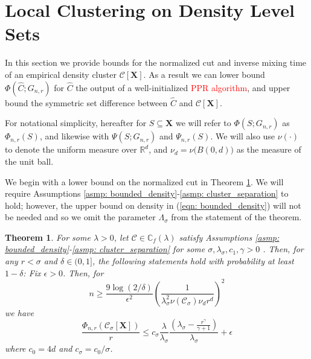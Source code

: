 \documentclass{article}
\newcommand{\Reals}{\mathbb{R}}
\newcommand{\Rd}{\Reals^d}
\newcommand{\1}{\mathbf{1}}
\newcommand{\Xbf}{\mathbf{X}}
\newcommand{\Cset}{\mathcal{C}}
\newcommand{\Csig}{\Cset_{\sigma}}
\theoremstyle{aldenthm}
\newtheorem{theorem}{Theorem}
\theoremstyle{remark}
\begin{document}
\section{Local Clustering on Density Level Sets}
\label{sec: local_clustering_on_density_level_set}

In this section we provide bounds for the normalized cut and inverse mixing time of an empirical density cluster $\Cset[\Xbf]$. As a result we can lower bound $\Phi(\widehat{C}; G_{n,r})$ for $\widehat{C}$ the output of a well-initialized \textcolor{red}{PPR algorithm}, and upper bound the symmetric set difference between $\widehat{C}$ and $\Cset[\Xbf]$. 

For notational simplicity, hereafter for $S \subseteq \Xbf$ we will refer to $\Phi(S; G_{n,r})$ as $\Phi_{n,r}(S)$, and likewise with $\Psi(S; G_{n,r})$ and $\Psi_{n,r}(S)$. We will also use $\nu(\cdot)$ to denote the uniform measure over $\Rd$, and $\nu_d = \nu\bigl(B(0,d)\bigr)$ as the measure of the unit ball.

We begin with a lower bound on the normalized cut in Theorem \ref{thm: conductance_upper_bound}. We will require Assumptions \ref{asmp: bounded_density}-\ref{asmp: cluster_separation} to hold; however, the upper bound on density in (\ref{eqn: bounded_density}) will not be needed and so we omit the parameter $\Lambda_{\sigma}$ from the statement of the theorem.
\begin{theorem}
	\label{thm: conductance_upper_bound}
	For some $\lambda > 0$, let $\Cset \in \mathbb{C}_f(\lambda)$ satisfy Assumptions \ref{asmp: bounded_density}-\ref{asmp: cluster_separation} for some $\sigma, \lambda_{\sigma}, c_1, \gamma > 0$ . Then, for any $r < \sigma$ and $\delta \in (0,1]$, the following statements hold with probability at least $1 - \delta$:  Fix $\epsilon > 0$. Then, for
		\begin{equation}
		\label{eqn: conductance_sample_complexity}
		n \geq \frac{9\log(2/\delta)}{\epsilon^2}\left(\frac{1}{ \lambda_{\sigma}^2 \nu(\Csig) \nu_d r^d}\right)^2 
		\end{equation}
		we have
		\begin{equation}
		\label{eqn: conductance_additive_error_bound}
		\frac{\Phi_{n,r}(\Csig[\mathbf{X}])}{r} \leq c_{\sigma} \frac{\lambda}{\lambda_{\sigma}} \frac{(\lambda_{\sigma} - \frac{r^{\gamma}}{\gamma+1})}{\lambda_{\sigma}} + \epsilon
		\end{equation}
	where $c_0 = 4d$ and $c_{\sigma} = c_0 / \sigma$. 
\end{theorem}
\end{document}
